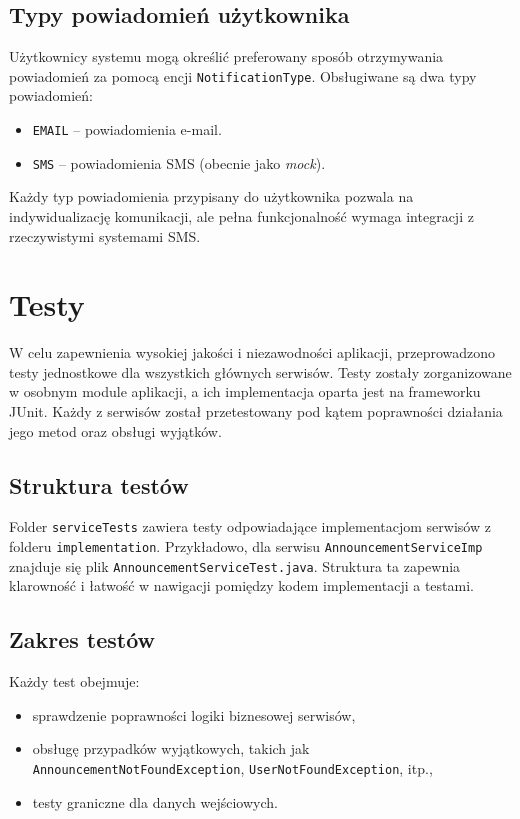 \subsection{Typy powiadomień użytkownika}

Użytkownicy systemu mogą określić preferowany sposób otrzymywania powiadomień za pomocą encji \texttt{NotificationType}. Obsługiwane są dwa typy powiadomień:
\begin{itemize}
    \item \texttt{EMAIL} -- powiadomienia e-mail.
    \item \texttt{SMS} -- powiadomienia SMS (obecnie jako \emph{mock}).
\end{itemize}

Każdy typ powiadomienia przypisany do użytkownika pozwala na indywidualizację komunikacji, ale pełna funkcjonalność wymaga integracji z rzeczywistymi systemami SMS. 


\section{Testy}
W celu zapewnienia wysokiej jakości i niezawodności aplikacji, przeprowadzono testy jednostkowe dla wszystkich głównych serwisów. Testy zostały zorganizowane w osobnym module aplikacji, a ich implementacja oparta jest na frameworku JUnit. Każdy z serwisów został przetestowany pod kątem poprawności działania jego metod oraz obsługi wyjątków.

\subsection{Struktura testów}
Folder \texttt{serviceTests} zawiera testy odpowiadające implementacjom serwisów z folderu \texttt{implementation}. Przykładowo, dla serwisu \texttt{AnnouncementServiceImp} znajduje się plik \texttt{AnnouncementServiceTest.java}. Struktura ta zapewnia klarowność i łatwość w nawigacji pomiędzy kodem implementacji a testami.

\subsection{Zakres testów}
Każdy test obejmuje:
\begin{itemize}
    \item sprawdzenie poprawności logiki biznesowej serwisów,
    \item obsługę przypadków wyjątkowych, takich jak \texttt{AnnouncementNotFoundException}, \texttt{UserNotFoundException}, itp.,
    \item testy graniczne dla danych wejściowych.
\end{itemize}

